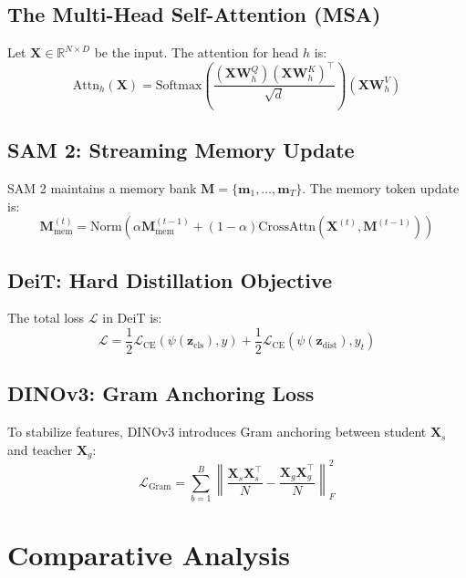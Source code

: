 \documentclass[twocolumn,10pt,a4paper]{article}
\begin{document}
\subsection{The Multi-Head Self-Attention (MSA)}
Let $\mathbf{X} \in \mathbb{R}^{N \times D}$ be the input. The attention for head $h$ is:
\begin{equation}
\text{Attn}_h(\mathbf{X}) = \text{Softmax}\left(\frac{(\mathbf{X}\mathbf{W}_h^Q)(\mathbf{X}\mathbf{W}_h^K)^\top}{\sqrt{d}}\right)(\mathbf{X}\mathbf{W}_h^V)
\end{equation}

\subsection{SAM 2: Streaming Memory Update}
SAM 2 maintains a memory bank $\mathbf{M} = \{\mathbf{m}_1, \dots, \mathbf{m}_T\}$. The memory token update is:
\begin{equation}
\mathbf{M}^{(t)}_{\text{mem}} = \text{Norm}(\alpha \mathbf{M}^{(t-1)}_{\text{mem}} + (1 - \alpha)\text{CrossAttn}(\mathbf{X}^{(t)}, \mathbf{M}^{(t-1)}))
\end{equation}

\subsection{DeiT: Hard Distillation Objective}
The total loss $\mathcal{L}$ in DeiT is:
\begin{equation}
\mathcal{L} = \frac{1}{2}\mathcal{L}_{\text{CE}}(\psi(\mathbf{z}_{\text{cls}}), y) + \frac{1}{2}\mathcal{L}_{\text{CE}}(\psi(\mathbf{z}_{\text{dist}}), y_t)
\end{equation}

\subsection{DINOv3: Gram Anchoring Loss}
To stabilize features, DINOv3 introduces Gram anchoring between student $\mathbf{X}_s$ and teacher $\mathbf{X}_g$:
\begin{equation}
\mathcal{L}_{\text{Gram}} = \sum_{b=1}^{B} \left\| \frac{\mathbf{X}_s \mathbf{X}_s^\top}{N} - \frac{\mathbf{X}_g \mathbf{X}_g^\top}{N} \right\|^2_F
\end{equation}

\section{Comparative Analysis}
\end{document}
